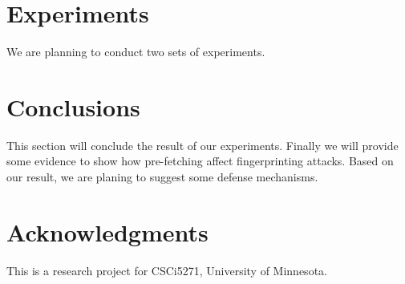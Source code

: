 \documentclass{sig-alternate-05-2015}
\begin{document}
%
%
\section{Experiments}
We are planning to conduct two sets of experiments.

\section{Conclusions}
This section will conclude the result of our experiments. Finally we will provide some evidence to show how pre-fetching affect fingerprinting attacks. Based on our result, we are planing to suggest some defense mechanisms.

\section{Acknowledgments}
This is a research project for CSCi5271, University of Minnesota.
\end{document}
